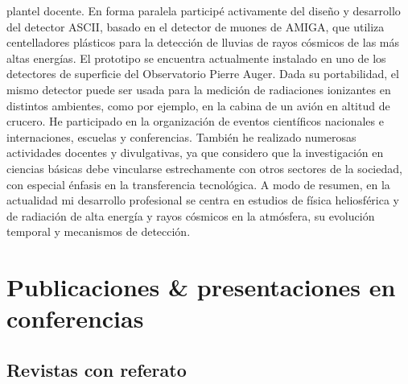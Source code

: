 \documentclass[11pt, a4paper]{article}
\begin{document}
plantel docente.  En forma paralela participé activamente del diseño y
desarrollo del detector ASCII, basado en el detector de muones de AMIGA, que
utiliza centelladores plásticos para la detección de lluvias de rayos cósmicos
de las más altas energías. El prototipo se encuentra actualmente instalado en
uno de los detectores de superficie del Observatorio Pierre Auger. Dada su
portabilidad, el mismo detector puede ser usada para la medición de radiaciones
ionizantes en distintos ambientes, como por ejemplo, en la cabina de un avión
en altitud de crucero.  He participado en la organización de eventos
científicos nacionales e internaciones, escuelas y conferencias. También he
realizado numerosas actividades docentes y divulgativas, ya que considero que
la investigación en ciencias básicas debe vincularse estrechamente con otros
sectores de la sociedad, con especial énfasis en la transferencia tecnológica.
A modo de resumen, en la actualidad mi desarrollo profesional se centra en
estudios de física heliosférica y de radiación de alta energía y rayos cósmicos
en la atmósfera, su evolución temporal y mecanismos de detección.

\section*{Publicaciones \& presentaciones en conferencias}

\subsection*{Revistas con referato}
\noindent
\end{document}
